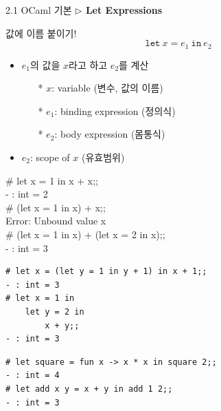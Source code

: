 \documentclass[10pt, xcolor=dvipsnames]{beamer}
\begin{document}
	\begin{frame}{2.1 OCaml 기본}
		\textbf{$\triangleright$ Let Expressions}
		
		값에 이름 붙이기! \[
		\texttt{let}\ x = e_1\ \texttt{in}\ e_2
		\]
		\begin{itemize}
			\item $e_1$의 값을 $x$라고 하고 $e_2$를 계산
			\begin{itemize}
				\item[*] $x$: variable (변수, 값의 이름)
				\item[*] $e_1$: binding expression (정의식)
				\item[*] $e_2$: body expression (몸통식)
			\end{itemize}
			\item $e_2$: scope of $x$ (유효범위)
		\end{itemize}
		 \begin{tcolorbox}[colback=backcolor]\ttfamily
			\# let x = 1 in x + x;;\\
			- : int = 2\\
			\# (let x = 1 in x) + x;;\\
			Error: Unbound value x\\
			\# (let x = 1 in x) + (let x = 2 in x);; \\
			- : int = 3
		\end{tcolorbox}	
		\begin{itemize}
			\item[] 
			\item[] 
			\item[] 
			\item[] 
			\item[] 
		\end{itemize}
	\end{frame}

\begin{lstlisting}[style=zsh]
# let x = (let y = 1 in y + 1) in x + 1;;
- : int = 3
# let x = 1 in
	let y = 2 in
		x + y;;
- : int = 3
\end{lstlisting}

\begin{lstlisting}[style=zsh]
# let square = fun x -> x * x in square 2;;
- : int = 4
# let add x y = x + y in add 1 2;;
- : int = 3
\end{lstlisting}
\end{document}
